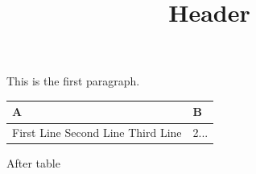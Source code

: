 \documentclass[11pt,a4paper]{article}
\title{Header}
\begin{document}
\maketitle

This is the first paragraph.

\begin{table}[h]
\begin{tabular}{|l|l|}
\hline
A & B \\ \hline
First Line Second Line Third Line & 2... \\ \hline
\end{tabular}
\end{table}

After table
\end{document}

